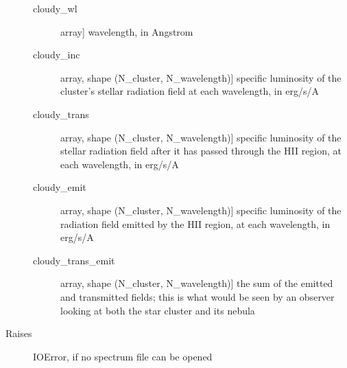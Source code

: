 \documentclass[letterpaper,10pt,english]{sphinxmanual}
\begin{document}
\begin{fulllineitems}
\begin{description}
\begin{description}
\item[{cloudy\_wl}] \leavevmode{[}array{]}
wavelength, in Angstrom

\item[{cloudy\_inc}] \leavevmode{[}array, shape (N\_cluster, N\_wavelength){]}
specific luminosity of the cluster's stellar radiation field at
each wavelength, in erg/s/A

\item[{cloudy\_trans}] \leavevmode{[}array, shape (N\_cluster, N\_wavelength){]}
specific luminosity of the stellar radiation field after it has
passed through the HII region, at each wavelength, in erg/s/A

\item[{cloudy\_emit}] \leavevmode{[}array, shape (N\_cluster, N\_wavelength){]}
specific luminosity of the radiation field emitted by the HII
region, at each wavelength, in erg/s/A

\item[{cloudy\_trans\_emit}] \leavevmode{[}array, shape (N\_cluster, N\_wavelength){]}
the sum of the emitted and transmitted fields; this is what
would be seen by an observer looking at both the star cluster
and its nebula

\end{description}

\item[{Raises}] \leavevmode
IOError, if no spectrum file can be opened

\end{description}

\end{fulllineitems}

\end{document}
